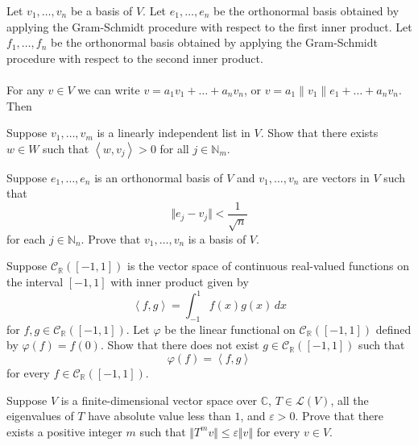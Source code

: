 \documentclass[12pt, letterpaper]{hmcpset}
\begin{document}
\begin{solution}
	Let $v_1, \dots, v_n$ be a basis of $V$. Let $e_1, \dots, e_n$ be the orthonormal basis obtained by applying the Gram-Schmidt procedure with respect to the first inner product. Let  $f_1, \dots, f_n$ be the orthonormal basis obtained by applying the Gram-Schmidt procedure with respect to the second inner product. \\\\
	For any $v \in V$ we can write $v = a_{1} v_{1} + \dots + a_{n} v_{n}$, or $v = a_{1} \lVert v_{1} \rVert e_{1} + \dots + a_{n} v_{n}$. Then
\end{solution}

\pagebreak

\begin{problem}[13.]
	Suppose $v_1, \dots, v_m$ is a linearly independent list in $V$. Show that there exists $w \in W$ such that $\left < w, v_j \right > > 0$ for all $j \in \mathbb N_m$.
\end{problem}

\pagebreak

\begin{problem}[14.]
	Suppose $e_1, \dots, e_n$ is an orthonormal basis of $V$ and $v_1, \dots, v_n$ are vectors in $V$ such that
	\[
		\Vert e_j - v_j \Vert < \frac{1}{\sqrt n}
	\]
	for each $j \in \mathbb N_n$. Prove that $v_1, \dots, v_n$ is a basis of $V$.
\end{problem}

\pagebreak

\begin{problem}[15.]
	Suppose $\mathcal C_{\mathbb R}([-1, 1])$ is the vector space of continuous real-valued functions on the interval $[-1, 1]$ with inner product given by
	\[
		\left < f, g \right > = \int_{-1}^1 f(x) g(x) \, dx
	\]
	for $f, g \in \mathcal C_{\mathbb R}([-1, 1])$. Let $\varphi$ be the linear functional on $\mathcal C_{\mathbb R}([-1, 1])$ defined by $\varphi(f) = f(0)$. Show that there does not exist $g \in \mathcal C_{\mathbb R}([-1, 1])$ such that
	\[
		\varphi(f) = \left < f, g \right >
	\]
	for every $f \in \mathcal C_{\mathbb R}([-1, 1])$.
\end{problem}

\pagebreak

\begin{problem}[16.]
	Suppose $V$ is a finite-dimensional vector space over $\mathbb C$, $T \in \mathcal L(V)$, all the eigenvalues of $T$ have absolute value less than $1$, and $\varepsilon > 0$. Prove that there exists a positive integer $m$ such that $\Vert T^m v \Vert \le \varepsilon \Vert v \Vert$ for every $v \in V$.
\end{problem}
\end{document}
